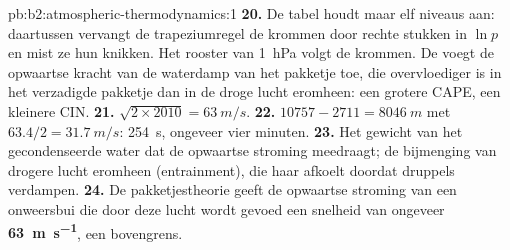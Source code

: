 \begin{solution}{pb:b2:atmospheric-thermodynamics:1}
\textbf{20.} De tabel houdt maar elf niveaus aan: daartussen vervangt de trapeziumregel de
krommen door rechte stukken in $\ln p$ en mist ze hun knikken. Het rooster van \qty{1}{hPa} volgt de krommen. De 
voegt de opwaartse kracht van de waterdamp van het pakketje toe, die overvloediger is in het verzadigde pakketje dan in
de droge lucht eromheen: een grotere CAPE, een kleinere CIN.
\textbf{21.} $\sqrt{2 \times 2010} = \qty{63}{m/s}$.
\textbf{22.} $10757 - 2711 = \qty{8046}{m}$ met $63.4/2 = \qty{31.7}{m/s}$: \qty{254}{s}, ongeveer vier
minuten.
\textbf{23.} Het gewicht van het gecondenseerde water dat de opwaartse stroming meedraagt; de bijmenging van drogere lucht
eromheen (entrainment), die haar afkoelt doordat druppels verdampen.
\textbf{24.} De pakketjestheorie geeft de opwaartse stroming van een onweersbui die door deze lucht wordt gevoed een snelheid van ongeveer
\textbf{\qty[text-series-to-math=true]{63}{m.s^{-1}}}, een bovengrens.
\end{solution}
